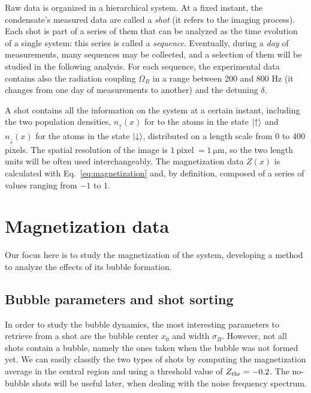 Raw data is organized in a hierarchical system. At a fixed instant, the condensate's measured data are called a \textit{shot} (it refers to the imaging process). Each shot is part of a series of them that can be analyzed as the time evolution of a single system: this series is called a \textit{sequence}. Eventually, during a \textit{day} of measurements, many sequences may be collected, and a selection of them will be studied in the following analysis. For each sequence, the experimental data contains also the radiation coupling $\Omega_R$ in a range between 200 and 800 \unit{\hertz} (it changes from one day of measurements to another) and the detuning $\delta$.

A shot contains all the information on the system at a certain instant, including the two population densities, $n_\uparrow(x)$ for to the atoms in the state $\ket{\uparrow}$ and $n_\downarrow(x)$ for the atoms in the state $\ket{\downarrow}$, distributed on a length scale from 0 to 400 pixels. The spatial resolution of the image is $1\ \text{pixel}\ = 1\ \unit{\micro\meter}$, so the two length units will be often used interchangeably. The magnetization data $Z(x)$ is calculated with Eq.\ \eqref{eq:magnetization} and, by definition, composed of a series of values ranging from $-1$ to $1$.

\section{Magnetization data}
Our focus here is to study the magnetization of the system, developing a method to analyze the effects of its bubble formation.

\subsection{Bubble parameters and shot sorting}
In order to study the bubble dynamics, the most interesting parameters to retrieve from a shot are the bubble center $x_0$ and width $\sigma_B$. However, not all shots contain a bubble, namely the ones taken when the bubble was not formed yet. We can easily classify the two types of shots by computing the magnetization average in the central region and using a threshold value of $Z_{\rm thr} = -0.2$. The no-bubble shots will be useful later, when dealing with the noise frequency spectrum.

